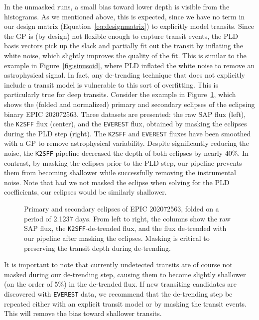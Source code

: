 \documentclass[]{emulateapj}
\newcommand{\note}[1]{{\color{red} #1}}
\begin{document}
\note{In the unmasked runs, a small bias toward lower depth is visible from the histograms.
As we mentioned above, this is expected, since we have no term in our design
matrix (Equation~\ref{eq:designmatrix}) to explicitly model transits. Since the GP
is (by design) not flexible enough to capture transit events, the PLD basis vectors
pick up the slack and partially fit out the transit by inflating the white noise,
which slightly improves the quality of the fit. This is similar to the example in 
Figure~\ref{fig:sinusoid}, where PLD inflated the white noise to remove an astrophysical
signal. In fact, any de-trending technique that does not explicitly include a transit
model is vulnerable to this sort of overfitting. This is particularly true for deep
transits. Consider the example in Figure~\ref{fig:202072563}, which shows the (folded
and normalized) primary and secondary eclipses of the eclipsing binary EPIC 202072563. Three datasets are
presented: the raw SAP flux (left), the \texttt{K2SFF} flux (center), and
the \texttt{EVEREST} flux, obtained by masking the eclipses during the PLD step
(right). The \texttt{K2SFF} and \texttt{EVEREST} fluxes have been smoothed with a GP to 
remove astrophysical variability. Despite significantly reducing the noise, the
\texttt{K2SFF} pipeline decreased the depth of both eclipses by nearly 40\%. In contrast,
by masking the eclipses prior to the PLD step, our pipeline prevents them from becoming
shallower while successfully removing the instrumental noise. Note that had we not
masked the eclipse when solving for the PLD coefficients, our eclipses would be
similarly shallower.}

\begin{figure}[h]
  \begin{center}
       \caption{Primary and secondary eclipses of EPIC 202072563, folded
                on a period of 2.1237 days. From left to right, the columns
                show the raw SAP flux, the \texttt{K2SFF}-de-trended flux, and the
                flux de-trended with our pipeline after masking the eclipses. Masking
                is critical to preserving the transit depth during de-trending.}
     \label{fig:202072563}
  \end{center}
\end{figure}

\note{It is important to note that currently undetected transits are of course not masked
during our de-trending step, causing them to become slightly shallower (on the order
of 5\%) in the de-trended flux. If new transiting candidates are discovered with
\texttt{EVEREST} data, we recommend that the de-trending step be repeated either with
an explicit transit model or by masking the transit events. This will remove the bias
toward shallower transits.}
\end{document}
